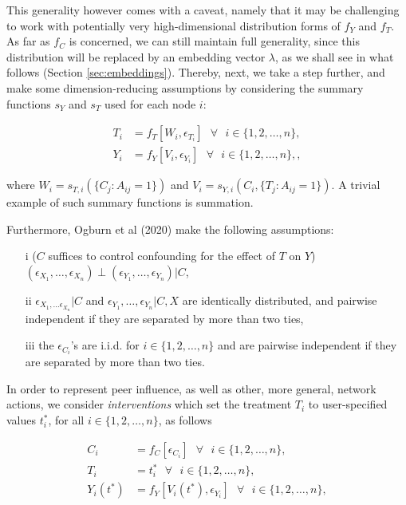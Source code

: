 \documentclass{article}
\begin{document}
This generality however comes with a caveat, namely that it may be challenging to work with potentially very high-dimensional distribution forms of $f_Y$ and $f_T$. As far as $f_C$ is concerned, we can still maintain full generality, since this distribution will be replaced by an embedding vector $\lambda$, as we shall see in what follows (Section \ref{sec:embeddings}). Thereby, next, we take a step further, and make some dimension-reducing assumptions by considering the summary functions $s_Y$ and $s_T$ used for each node $i$:

\begin{align*}
 T_i &= f_T[W_i, \epsilon_{T_i}] \mbox{ } \forall \mbox{ } i \in \{1, 2, \hdots, n\},\\
 Y_i &= f_Y[V_i, \epsilon_{Y_i}] \mbox{ } \forall \mbox{ } i \in \{1, 2, \hdots, n\},,
\end{align*}

\noindent where $W_i = s_{T, i}(\{C_j: A_{ij} =1 \})$ and $V_i = s_{Y, i}(C_i, \{T_j: A_{ij} =1\})$. A trivial example of such summary functions is summation. 

Furthermore, Ogburn et al (2020) \cite{Ogburn2020} make the following assumptions:

\begin{itemize}
\item[i] ($C$ suffices to control confounding for the effect of $T$ on $Y$) $(\epsilon_{X_1}, \hdots, \epsilon_{X_n}) \perp (\epsilon_{Y_1}, \hdots, \epsilon_{Y_n}) | C$, 
\item[ii] $\epsilon_{X_1, \hdots \epsilon_{X_n}} | C$ and $\epsilon_{Y_1}, \hdots, \epsilon_{Y_n} | C, X$ are identically distributed, and pairwise independent if they are separated by more than two ties, 
\item[iii] the $\epsilon_{C_i}$'s are i.i.d. for $i \in \{1,2, \hdots, n\}$ and are pairwise independent if they are separated by more than two ties. 
\end{itemize}

In order to represent peer influence, as well as other, more general, network actions, we consider \textit{interventions} which set the treatment $T_i$ to user-specified values $t_i^*$, for all $i \in \{1, 2, \hdots, n \}$, as follows

\begin{align*}
C_i &= f_C[\epsilon_{C_i}] \mbox{ } \forall \mbox{ } i \in \{1, 2, \hdots, n\}, \\
T_i  &= t_i^* \mbox{ } \forall \mbox{ } i \in \{1, 2, \hdots, n\}, \\
Y_i(t^*) &= f_Y[V_i(t^*), \epsilon_{Y_i}]  \mbox{ } \forall \mbox{ } i \in \{1, 2, \hdots, n\}, \\
\end{align*}
\end{document}
